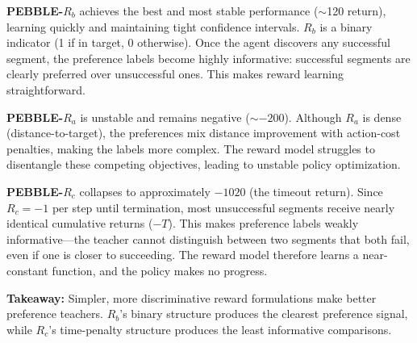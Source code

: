 \documentclass[11pt,a4paper]{article}
\begin{document}
\textbf{PEBBLE-$R_b$} achieves the best and most stable performance ($\sim$120 return), learning quickly and maintaining tight confidence intervals. $R_b$ is a binary indicator (1 if in target, 0 otherwise). Once the agent discovers any successful segment, the preference labels become highly informative: successful segments are clearly preferred over unsuccessful ones. This makes reward learning straightforward.

\textbf{PEBBLE-$R_a$} is unstable and remains negative ($\sim -200$). Although $R_a$ is dense (distance-to-target), the preferences mix distance improvement with action-cost penalties, making the labels more complex. The reward model struggles to disentangle these competing objectives, leading to unstable policy optimization.

\textbf{PEBBLE-$R_c$} collapses to approximately $-1020$ (the timeout return). Since $R_c = -1$ per step until termination, most unsuccessful segments receive nearly identical cumulative returns ($-T$). This makes preference labels weakly informative---the teacher cannot distinguish between two segments that both fail, even if one is closer to succeeding. The reward model therefore learns a near-constant function, and the policy makes no progress.

\textbf{Takeaway:} Simpler, more discriminative reward formulations make better preference teachers. $R_b$'s binary structure produces the clearest preference signal, while $R_c$'s time-penalty structure produces the least informative comparisons.
\end{document}
